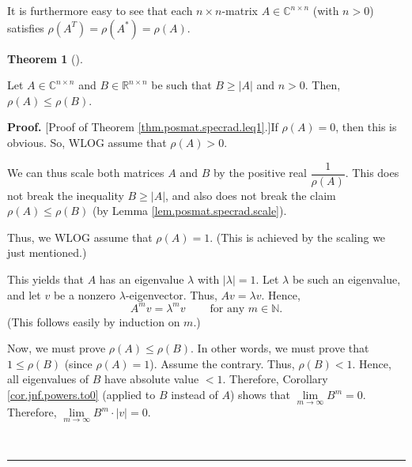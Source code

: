 \documentclass[numbers=enddot,12pt,final,onecolumn,notitlepage]{scrartcl}%
\numberwithin{exer}{subsection}
\theoremstyle{definition}
\newtheorem{theo}{Theorem}[subsection]
\newenvironment{theorem}[1][]
{\begin{theo}[#1]\begin{leftbar}}
{\end{leftbar}\end{theo}}
\newenvironment{proof}[1][Proof]{\noindent\textbf{#1.} }{\ \rule{0.5em}{0.5em}}
\begin{document}
It is furthermore easy to see that each $n\times n$-matrix $A\in
\mathbb{C}^{n\times n}$ (with $n>0$) satisfies $\rho\left(  A^{T}\right)
=\rho\left(  A^{\ast}\right)  =\rho\left(  A\right)  $.

\begin{theorem}
\label{thm.posmat.specrad.leq1}Let $A\in\mathbb{C}^{n\times n}$ and
$B\in\mathbb{R}^{n\times n}$ be such that $B\geq\left\vert A\right\vert $ and
$n>0$. Then, $\rho\left(  A\right)  \leq\rho\left(  B\right)  $.
\end{theorem}

\begin{proof}
[Proof of Theorem \ref{thm.posmat.specrad.leq1}.]If $\rho\left(  A\right)
=0$, then this is obvious. So, WLOG assume that $\rho\left(  A\right)  >0$.

We can thus scale both matrices $A$ and $B$ by the positive real $\dfrac
{1}{\rho\left(  A\right)  }$. This does not break the inequality
$B\geq\left\vert A\right\vert $, and also does not break the claim
$\rho\left(  A\right)  \leq\rho\left(  B\right)  $ (by Lemma
\ref{lem.posmat.specrad.scale}).

Thus, we WLOG assume that $\rho\left(  A\right)  =1$. (This is achieved by the
scaling we just mentioned.)

This yields that $A$ has an eigenvalue $\lambda$ with $\left\vert
\lambda\right\vert =1$. Let $\lambda$ be such an eigenvalue, and let $v$ be a
nonzero $\lambda$-eigenvector. Thus, $Av=\lambda v$. Hence,%
\begin{equation}
A^{m}v=\lambda^{m}v\ \ \ \ \ \ \ \ \ \ \text{for any }m\in\mathbb{N}.
\label{pf.thm.posmat.specrad.leq1.Amv=}%
\end{equation}
(This follows easily by induction on $m$.)

Now, we must prove $\rho\left(  A\right)  \leq\rho\left(  B\right)  $. In
other words, we must prove that $1\leq\rho\left(  B\right)  $ (since
$\rho\left(  A\right)  =1$). Assume the contrary. Thus, $\rho\left(  B\right)
<1$. Hence, all eigenvalues of $B$ have absolute value $<1$. Therefore,
Corollary \ref{cor.jnf.powers.to0} (applied to $B$ instead of $A$) shows that
$\lim\limits_{m\rightarrow\infty}B^{m}=0$. Therefore, $\lim
\limits_{m\rightarrow\infty}B^{m}\cdot\left\vert v\right\vert =0$.


\end{proof}
\end{document}
